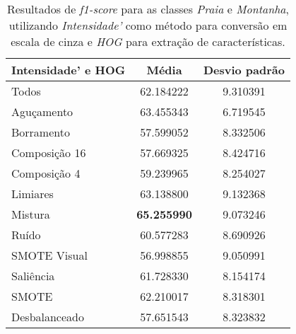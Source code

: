 \begin{itemize}
\begin{table}[!htbp]
\centering
\caption{Resultados de \textit{f1-score} para as classes \emph{Praia} e \emph{Montanha}, utilizando \emph{Intensidade'} como método para conversão em escala de cinza e \emph{HOG} para extração de características.}
\label{tab:resultados:2:pior}
\begin{tabular}{|l|c|c|}
\hline
\textbf{Intensidade' e HOG} & \textbf{Média}     & \textbf{Desvio padrão} \\ \hline
Todos                      & 62.184222          & 9.310391               \\ \hline
Aguçamento                 & 63.455343          & 6.719545               \\ \hline
Borramento                 & 57.599052          & 8.332506               \\ \hline
Composição 16              & 57.669325          & 8.424716               \\ \hline
Composição 4               & 59.239965          & 8.254027               \\ \hline
Limiares                   & 63.138800          & 9.132368               \\ \hline
Mistura                    & \textbf{65.255990} & 9.073246               \\ \hline
Ruído                      & 60.577283          & 8.690926               \\ \hline
SMOTE Visual               & 56.998855          & 9.050991               \\ \hline
Saliência                  & 61.728330          & 8.154174               \\ \hline
SMOTE                      & 62.210017          & 8.318301               \\ \hline
Desbalanceado              & 57.651543          & 8.323832               \\ \hline
\end{tabular}
\end{table}




\end{itemize}
